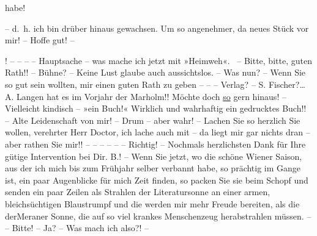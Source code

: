                habe! \begin{otherlanguage}{french}\label{K_L03708-3v}\label{K_L03708-3}{ }\end{otherlanguage} – d. h. ich bin drüber hinaus gewachsen. Um so angenehmer, da neues Stück vor mir! – Hoffe gut! –
                  \begin{otherlanguage}{italian}\label{K_L03708-4v}\label{K_L03708-4}{ }\end{otherlanguage}! – – – – Hauptsache – was mache ich jetzt mit »Heimweh«.  – Bitte, bitte, guten Rath!! – Bühne? – Keine
               Lust {\pb}glaube auch aussichtslos. – Was nun? – Wenn Sie so gut sein
               wollten, mir einen guten Rath zu geben – – – Verlag? – S. Fischer?{\dots}{ }A. Langen hat es im Vorjahr der Marholm\label{K_L03708-5v}\label{K_L03708-5}!! Möchte doch \uline{so} gern hinaus! –
               Vielleicht kindisch – »ein Buch!« Wirklich und wahrhaftig ein gedrucktes Buch!!  –
               Alte Leidenschaft von mir! – Drum – aber wahr! – Lachen Sie so herzlich Sie wollen,
               verehrter Herr Doctor, ich lache auch mit – da liegt mir gar nichts dran – aber
               rathen Sie mir!! – – – – – – Richtig! – Nochmals herzlichsten Dank für Ihre gütige
               Intervention bei Dir. B.! – Wenn Sie jetzt, wo
               die schöne Wiener Saison, aus der ich mich bis zum
                  Frühjahr selber verbannt habe, so prächtig im Gange ist, ein paar
               Augenblicke für mich Zeit finden, so packen Sie sie beim Schopf und senden ein paar
               Zeilen als Strahlen der Literatursonne an einer armen, bleichsüchtigen Blaustrumpf
               und die werden mir mehr Freude bereiten, als die \introOben{}der\introOben{}{ }Meraner Sonne, die auf so viel krankes
               Menschenzeug herabstrahlen müssen. – – Bitte! – Ja? – Was mach ich also?! – \pend
           

